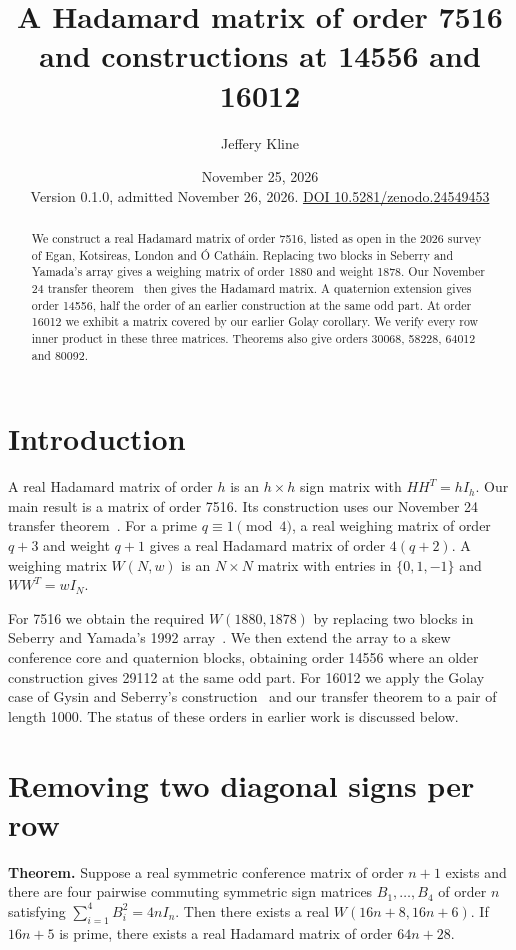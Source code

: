 \documentclass[10pt]{article}
\title{A Hadamard matrix of order 7516 and constructions at 14556 and 16012}
\author{Jeffery Kline}
\date{November 25, 2026\\[3pt]\small Version 0.1.0, admitted November 26, 2026. \href{https://doi.org/10.5281/zenodo.24549453}{DOI 10.5281/zenodo.24549453}}
\begin{document}
\maketitle
\begin{abstract}
We construct a real Hadamard matrix of order 7516, listed as open in the 2026 survey of Egan, Kotsireas, London and \'O Cath\'ain. Replacing two blocks in Seberry and Yamada's array gives a weighing matrix of order 1880 and weight 1878. Our November 24 transfer theorem~\cite{transfer} then gives the Hadamard matrix. A quaternion extension gives order 14556, half the order of an earlier construction at the same odd part. At order 16012 we exhibit a matrix covered by our earlier Golay corollary. We verify every row inner product in these three matrices. Theorems also give orders 30068, 58228, 64012 and 80092.
\end{abstract}

\section{Introduction}

A real Hadamard matrix of order $h$ is an $h\times h$ sign matrix with $HH^T=hI_h$. Our main result is a matrix of order 7516. Its construction uses our November 24 transfer theorem~\cite{transfer}. For a prime $q\equiv1\pmod4$, a real weighing matrix of order $q+3$ and weight $q+1$ gives a real Hadamard matrix of order $4(q+2)$. A weighing matrix $W(N,w)$ is an $N\times N$ matrix with entries in $\{0,1,-1\}$ and $WW^T=wI_N$.

For 7516 we obtain the required $W(1880,1878)$ by replacing two blocks in Seberry and Yamada's 1992 array~\cite{sy}. We then extend the array to a skew conference core and quaternion blocks, obtaining order 14556 where an older construction gives 29112 at the same odd part. For 16012 we apply the Golay case of Gysin and Seberry's construction~\cite{gs} and our transfer theorem to a pair of length 1000. The status of these orders in earlier work is discussed below.

\section{Removing two diagonal signs per row}

\noindent\textbf{Theorem.}
Suppose a real symmetric conference matrix of order $n+1$ exists and there are four pairwise commuting symmetric sign matrices $B_1,\dots,B_4$ of order $n$ satisfying $\sum_{i=1}^4 B_i^2=4nI_n$. Then there exists a real $W(16n+8,16n+6)$. If $16n+5$ is prime, there exists a real Hadamard matrix of order $64n+28$.
\end{document}

